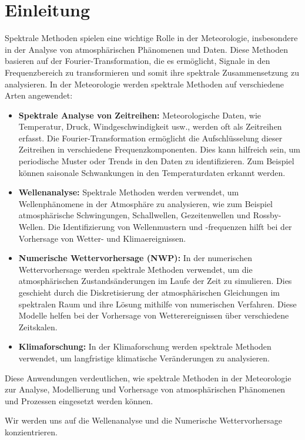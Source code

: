 %
%
%
%
\section{Einleitung\label{spektral:section:Einleitung}}

Spektrale Methoden spielen eine wichtige Rolle in der Meteorologie, insbesondere in der Analyse von atmosphärischen Phänomenen und Daten.
Diese Methoden basieren auf der Fourier-Transformation, die es ermöglicht, Signale in den Frequenzbereich zu transformieren und somit ihre spektrale Zusammensetzung zu analysieren.
In der Meteorologie werden spektrale Methoden auf verschiedene Arten angewendet:

\begin{itemize}
\item
\textbf{Spektrale Analyse von Zeitreihen:} Meteorologische Daten, wie Temperatur, Druck, Windgeschwindigkeit usw., werden oft als Zeitreihen erfasst.
Die Fourier-Transformation ermöglicht die Aufschlüsselung dieser Zeitreihen in verschiedene Frequenzkomponenten.
Dies kann hilfreich sein, um periodische Muster oder Trends in den Daten zu identifizieren. 
Zum Beispiel können saisonale Schwankungen in den Temperaturdaten erkannt werden.
\item
\textbf{Wellenanalyse:} Spektrale Methoden werden verwendet, um Wellenphänomene in der Atmosphäre zu analysieren, wie zum Beispiel atmosphärische Schwingungen, Schallwellen, Gezeitenwellen und Rossby-Wellen.
Die Identifizierung von Wellenmustern und -frequenzen hilft bei der Vorhersage von Wetter- und Klimaereignissen.
\item
\textbf{Numerische Wettervorhersage (NWP):} In der numerischen Wettervorhersage werden spektrale Methoden verwendet, um die atmosphärischen Zustandsänderungen im Laufe der Zeit zu simulieren.
Dies geschieht durch die Diskretisierung der atmosphärischen Gleichungen im spektralen Raum und ihre Lösung mithilfe von numerischen Verfahren.
Diese Modelle helfen bei der Vorhersage von Wetterereignissen über verschiedene Zeitskalen.
\item
\textbf{Klimaforschung:} In der Klimaforschung werden spektrale Methoden verwendet, um langfristige klimatische Veränderungen zu analysieren.
\end{itemize}

Diese Anwendungen verdeutlichen, wie spektrale Methoden in der Meteorologie zur Analyse, Modellierung und Vorhersage von atmosphärischen Phänomenen und Prozessen eingesetzt werden können.

Wir werden uns auf die Wellenanalyse und die Numerische Wettervorhersage konzientrieren.